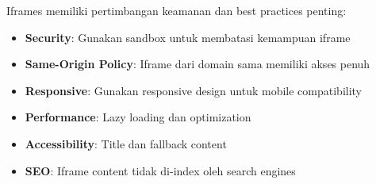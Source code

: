 Iframes memiliki pertimbangan keamanan dan best practices penting:

\begin{itemize}
  \item \textbf{Security}: Gunakan sandbox untuk membatasi kemampuan iframe
  \item \textbf{Same-Origin Policy}: Iframe dari domain sama memiliki akses penuh
  \item \textbf{Responsive}: Gunakan responsive design untuk mobile compatibility
  \item \textbf{Performance}: Lazy loading dan optimization
  \item \textbf{Accessibility}: Title dan fallback content
  \item \textbf{SEO}: Iframe content tidak di-index oleh search engines
\end{itemize}

